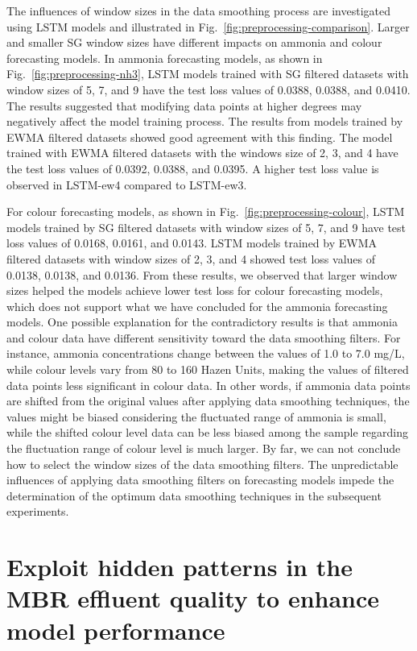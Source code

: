The influences of window sizes in the data smoothing process are investigated using LSTM models and illustrated in Fig.~\ref{fig:preprocessing-comparison}. Larger and smaller SG window sizes have different impacts on ammonia and colour forecasting models. In ammonia forecasting models, as shown in Fig.~\ref{fig:preprocessing-nh3}, LSTM models trained with SG filtered datasets with window sizes of 5, 7, and 9 have the test loss values of 0.0388, 0.0388, and 0.0410. The results suggested that modifying data points at higher degrees may negatively affect the model training process. The results from models trained by EWMA filtered datasets showed good agreement with this finding. The model trained with EWMA filtered datasets with the windows size of 2, 3, and 4 have the test loss values of 0.0392, 0.0388, and 0.0395. A higher test loss value is observed in LSTM-ew4 compared to LSTM-ew3.

For colour forecasting models, as shown in Fig.~\ref{fig:preprocessing-colour}, LSTM models trained by SG filtered datasets with window sizes of 5, 7, and 9 have test loss values of 0.0168, 0.0161, and 0.0143. LSTM models trained by EWMA filtered datasets with window sizes of 2, 3, and 4 showed test loss values of 0.0138, 0.0138, and 0.0136. From these results, we observed that larger window sizes helped the models achieve lower test loss for colour forecasting models, which does not support what we have concluded for the ammonia forecasting models. One possible explanation for the contradictory results is that ammonia and colour data have different sensitivity toward the data smoothing filters. For instance, ammonia concentrations change between the values of 1.0 to 7.0 mg/L, while colour levels vary from 80 to 160 Hazen Units, making the values of filtered data points less significant in colour data. In other words, if ammonia data points are shifted from the original values after applying data smoothing techniques, the values might be biased considering the fluctuated range of ammonia is small, while the shifted colour level data can be less biased among the sample regarding the fluctuation range of colour level is much larger. By far, we can not conclude how to select the window sizes of the data smoothing filters. The unpredictable influences of applying data smoothing filters on forecasting models impede the determination of the optimum data smoothing techniques in the subsequent experiments. 

\section{Exploit hidden patterns in the MBR effluent quality to enhance model performance}
